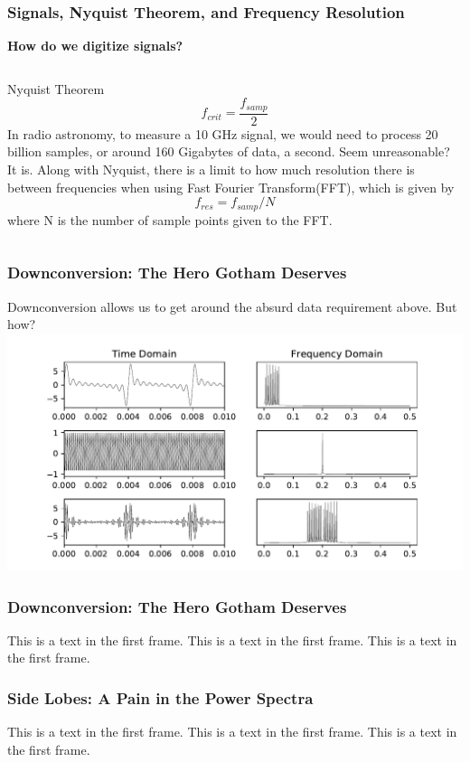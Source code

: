 \documentclass{beamer}
\begin{document}
\begin{frame}
\frametitle{Signals, Nyquist Theorem, and Frequency Resolution}
\center \textbf{How do we digitize signals?}
\bigskip
\begin{columns}
Nyquist Theorem
\begin{equation}
f_{crit} = \frac{f_{samp}}{2}
\end{equation}
In radio astronomy, to measure a 10 GHz signal, we would need to process 20 billion samples, or around 160 Gigabytes of data, a second.  Seem unreasonable? It is.
Along with Nyquist, there is a limit to how much resolution there is between frequencies when using Fast Fourier Transform(FFT), which is given by 
\begin{equation}
f_{res} = f_{samp}/N
\end{equation}
where N is the number of sample points given to the FFT.
\end{columns}
\end{frame}

\begin{frame}
\frametitle{Downconversion:  The Hero Gotham Deserves}
\center Downconversion allows us to get around the absurd data requirement above. But how?
\includegraphics[scale=.5]{Figure_3.pdf}
\end{frame}

\begin{frame}
\frametitle{Downconversion:  The Hero Gotham Deserves}
This is a text in the first frame. This is a text in the first frame. This is a text in the first frame.
\end{frame}

\begin{frame}
\frametitle{Side Lobes: A Pain in the Power Spectra}
This is a text in the first frame. This is a text in the first frame. This is a text in the first frame.
\end{frame}
\end{document}
